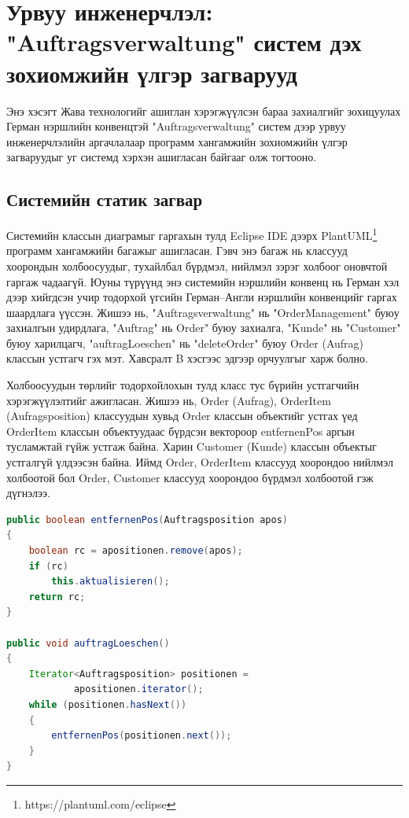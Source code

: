 \section{Урвуу инженерчлэл: "Auftragsverwaltung" систем дэх зохиомжийн үлгэр загварууд}
Энэ хэсэгт Жава технологийг ашиглан хэрэгжүүлсэн бараа захиалгийг зохицуулах Герман нэршлийн конвенцтэй "Auftragsverwaltung" систем дээр урвуу инженерчлэлийн аргачлалаар программ хангамжийн зохиомжийн үлгэр загваруудыг уг системд хэрхэн ашигласан байгааг олж тогтооно.

\subsection{Системийн статик загвар}
Системийн классын диаграмыг гаргахын тулд Eclipse IDE дээрх PlantUML\footnote{https://plantuml.com/eclipse} программ хангамжийн багажыг ашигласан. Гэвч энэ багаж нь классууд хоорондын холбоосуудыг, тухайлбал бүрдмэл, нийлмэл зэрэг холбоог оновчтой гаргаж чадаагүй. Юуны түрүүнд энэ системийн нэршлийн конвенц нь Герман хэл дээр хийгдсэн учир тодорхой үгсийн Герман–Англи нэршлийн конвенцийг гаргах шаардлага үүссэн. Жишээ нь, "Auftragsverwaltung" нь "OrderManagement" буюу захиалгын удирдлага, "Auftrag" нь Order" буюу захиалга, "Kunde" нь "Customer" буюу харилцагч, "auftragLoeschen" нь "deleteOrder" буюу Order (Aufrag) классын устгагч гэх мэт. Хавсралт B хэсгээс эдгээр орчуулгыг харж болно.

Холбоосуудын төрлийг тодорхойлохын тулд класс тус бүрийн устгагчийн хэрэгжүүлэлтийг ажигласан. Жишээ нь, Order (Aufrag), OrderItem (Aufragsposition) классуудын хувьд Order классын объектийг устгах үед OrderItem классын объектуудаас бүрдсэн вектороор entfernenPos аргын тусламжтай гүйж устгаж байна. Харин Customer (Kunde) классын объектыг устгалгүй үлдээсэн байна. Иймд Order, OrderItem классууд хоорондоо нийлмэл холбоотой бол Order, Customer классууд хоорондоо бүрдмэл холбоотой гэж дүгнэлээ.
\begin{lstlisting}[language=Java, caption=Order классын устгагч auftragLoeschen, frame=single]
public boolean entfernenPos(Auftragsposition apos)
{
    boolean rc = apositionen.remove(apos);
    if (rc)
        this.aktualisieren();
    return rc;
}

public void auftragLoeschen()
{
    Iterator<Auftragsposition> positionen =
            apositionen.iterator();
    while (positionen.hasNext())
    {
        entfernenPos(positionen.next());
    }
}
\end{lstlisting}

